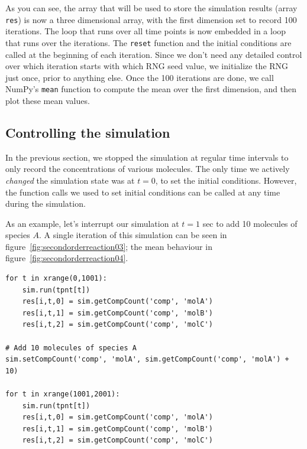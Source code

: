 \documentclass[a4paper,12pt]{book}
\begin{document}
As you can see, the array that will be used to store the simulation results (array \texttt{res}) is now a three dimensional array, with the first dimension set to record 100 iterations. The loop that runs over all time points is now embedded in a loop that runs over the iterations. The \texttt{reset} function and the initial conditions are called at the beginning of each iteration. Since we don't need any detailed control over which iteration starts with which RNG seed value, we initialize the RNG just once, prior to anything else. Once the 100 iterations are done, we call NumPy's \texttt{mean} function to compute the mean over the first dimension, and then plot these mean values. 

\subsection{Controlling the simulation}

In the previous section, we stopped the simulation at regular time intervals to only record the concentrations of various molecules. The only time we actively \emph{changed} the simulation state was at $t=0$, to set the initial conditions. However, the function calls we used to set initial conditions can be called at any time during the simulation. 

As an example, let's interrupt our simulation at $t=1$ sec to add 10 molecules of species $A$. A single iteration of this simulation can be seen in figure~\ref{fig:secondorderreaction03}; the mean behaviour in figure~\ref{fig:secondorderreaction04}. 

\begin{verbatim}
for t in xrange(0,1001):
    sim.run(tpnt[t])
    res[i,t,0] = sim.getCompCount('comp', 'molA')
    res[i,t,1] = sim.getCompCount('comp', 'molB')
    res[i,t,2] = sim.getCompCount('comp', 'molC')
    
# Add 10 molecules of species A
sim.setCompCount('comp', 'molA', sim.getCompCount('comp', 'molA') + 10)

for t in xrange(1001,2001):
    sim.run(tpnt[t])
    res[i,t,0] = sim.getCompCount('comp', 'molA')
    res[i,t,1] = sim.getCompCount('comp', 'molB')
    res[i,t,2] = sim.getCompCount('comp', 'molC')
\end{verbatim}
\end{document}
